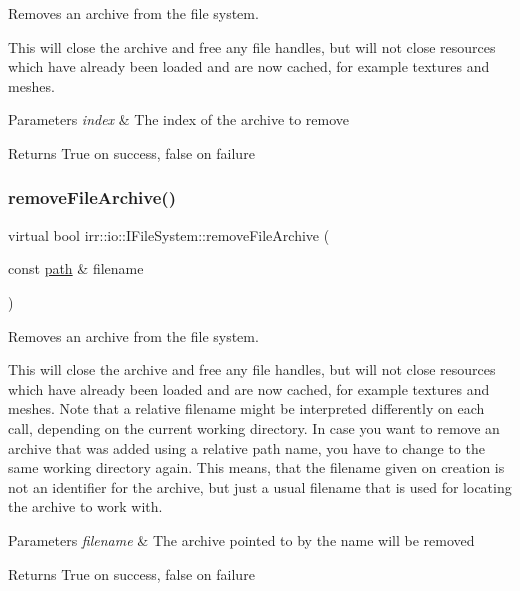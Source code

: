 Removes an archive from the file system. 

This will close the archive and free any file handles, but will not close resources which have already been loaded and are now cached, for example textures and meshes. 
\begin{DoxyParams}{Parameters}
{\em index} & The index of the archive to remove \\
\hline
\end{DoxyParams}
\begin{DoxyReturn}{Returns}
True on success, false on failure 
\end{DoxyReturn}
\mbox{\label{classirr_1_1io_1_1IFileSystem_a03b405c8f5346c225c590cde585eb73c}} 
\subsubsection{\texorpdfstring{remove\+File\+Archive()}{removeFileArchive()}\hspace{0.1cm}{\footnotesize\ttfamily [3/6]}}
{\footnotesize\ttfamily virtual bool irr\+::io\+::\+I\+File\+System\+::remove\+File\+Archive (\begin{DoxyParamCaption}\item[{const \hyperlink{namespaceirr_1_1io_a6468281622ce3a1c46b72e19f32dded5}{path} \&}]{filename }\end{DoxyParamCaption})\hspace{0.3cm}{\ttfamily [pure virtual]}}



Removes an archive from the file system. 

This will close the archive and free any file handles, but will not close resources which have already been loaded and are now cached, for example textures and meshes. Note that a relative filename might be interpreted differently on each call, depending on the current working directory. In case you want to remove an archive that was added using a relative path name, you have to change to the same working directory again. This means, that the filename given on creation is not an identifier for the archive, but just a usual filename that is used for locating the archive to work with. 
\begin{DoxyParams}{Parameters}
{\em filename} & The archive pointed to by the name will be removed \\
\hline
\end{DoxyParams}
\begin{DoxyReturn}{Returns}
True on success, false on failure 
\end{DoxyReturn}
\mbox{\label{classirr_1_1io_1_1IFileSystem_a03b405c8f5346c225c590cde585eb73c}} 
